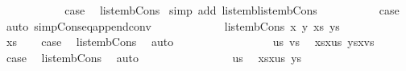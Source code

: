\begin{isabellebody}
\ \ \ \ \ \ \ \ \isamarkupfalse%
\ \isamarkupfalse%
\ {\isacharquery}case\ \isamarkupfalse%
\ list{\isacharunderscore}emb{\isacharunderscore}Cons{\isacharparenleft}{}{\isacharparenright}\ \isamarkupfalse%
{\isacharparenleft}simp\ add{\isacharcolon}\ list{\isacharunderscore}emb{\isachardot}list{\isacharunderscore}emb{\isacharunderscore}Cons{\isacharparenright}\ \isacommand{{\isacharbraceright}}\isamarkupfalse%
\isanewline
\ \ \ \ \ \ \isamarkupfalse%
\ \isamarkupfalse%
\ {\isacharquery}case\ \isamarkupfalse%
\ {\isacharparenleft}auto\ simp{\isacharcolon}Cons{\isacharunderscore}eq{\isacharunderscore}append{\isacharunderscore}conv{\isacharparenright}\isanewline
\ \ \ \ \isamarkupfalse%
\isanewline
\ \ \ \ \ \ \isamarkupfalse%
\ {\isacharparenleft}list{\isacharunderscore}emb{\isacharunderscore}Cons{}\ x\ y\ xs{\isacharprime}\ ys{\isacharprime}{\isacharparenright}\isanewline
\ \ \ \ \ \ \isacommand{{\isacharbraceleft}}\isamarkupfalse%
\ \isamarkupfalse%
\ {\isachardoublequoteopen}xs{\isacharequal}{\isacharbrackleft}{\isacharbrackright}{\isachardoublequoteclose}\ \isamarkupfalse%
\ \isamarkupfalse%
\ {\isacharquery}case\ \isamarkupfalse%
\ list{\isacharunderscore}emb{\isacharunderscore}Cons{}{\isacharparenleft}{}{\isacharparenright}\ \isamarkupfalse%
\ auto\ \isacommand{{\isacharbraceright}}\isamarkupfalse%
\isanewline
\ \ \ \ \ \ \isamarkupfalse%
\isanewline
\ \ \ \ \ \ \isacommand{{\isacharbraceleft}}\isamarkupfalse%
\ \isamarkupfalse%
\ us\ vs\ \isamarkupfalse%
\ {\isachardoublequoteopen}xs{\isacharequal}x{\isacharhash}us{\isachardoublequoteclose}\ {\isachardoublequoteopen}ys{\isacharequal}x{\isacharhash}vs{\isachardoublequoteclose}\ \isamarkupfalse%
\ \isamarkupfalse%
\ {\isacharquery}case\ \isamarkupfalse%
\ list{\isacharunderscore}emb{\isacharunderscore}Cons{}\ \isamarkupfalse%
\ auto\isacommand{{\isacharbraceright}}\isamarkupfalse%
\isanewline
\ \ \ \ \ \ \isamarkupfalse%
\isanewline
\ \ \ \ \ \ \isacommand{{\isacharbraceleft}}\isamarkupfalse%
\ \isamarkupfalse%
\ us\ \isamarkupfalse%
\ {\isachardoublequoteopen}xs{\isacharequal}x{\isacharhash}us{\isachardoublequoteclose}\ {\isachardoublequoteopen}ys{\isacharequal}{\isacharbrackleft}{\isacharbrackright}{\isachardoublequoteclose}\ \isamarkupfalse%

\end{isabellebody}
